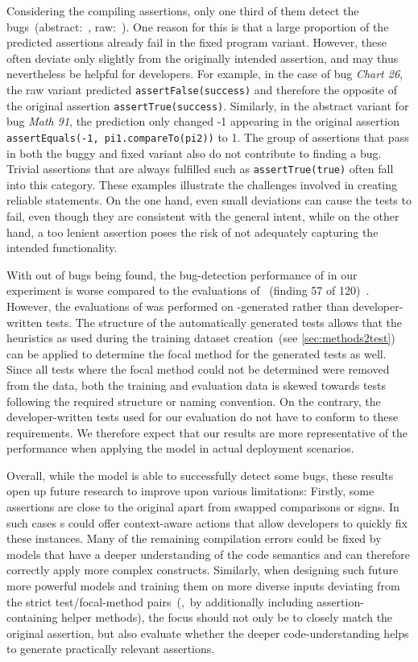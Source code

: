 Considering the compiling assertions, only one third of them detect
the bugs~(abstract:~, raw:~). One reason for
this is that a large proportion of the predicted assertions already
fail in the fixed program variant. However, these often deviate only
slightly from the originally intended assertion, and may thus
nevertheless be helpful for developers.
For example, in the case of bug \emph{Chart 26}, the raw variant
predicted \verb|assertFalse(success)| and therefore the opposite of
the original assertion \verb|assertTrue(success)|.
Similarly, in the abstract variant for bug \emph{Math 91}, the
prediction only changed -1 appearing in the original assertion
\verb|assertEquals(-1, pi1.compareTo(pi2))| to 1.
The group of assertions that pass in both the buggy and fixed variant
also do not contribute to finding a bug. Trivial assertions that are
always fulfilled such as \verb|assertTrue(true)| often fall into this
category.
These examples illustrate the challenges involved in creating reliable
statements. On the one hand, even small deviations can cause the tests
to fail, even though they are consistent with the general intent,
while on the other hand, a too lenient assertion poses the risk of not
adequately capturing the intended functionality.

With \dfjRawFoundBugs out of \dfjAssertionLocationInTestTotalBugs bugs
being found, the bug-detection performance of \assertfive in our
experiment is worse compared to the evaluations of \toga~(finding 57
of 120)~\cite{Dinella2022}. However, the evaluations of \toga was
performed on \evosuite-generated rather than developer-written tests.
The structure of the automatically generated tests allows that the
heuristics as used during the \methodstotest training dataset
creation~(see \cref{sec:methods2test}) can be applied to determine the
focal method for the generated tests as well.
Since all tests where the focal method could not be determined were
removed from the \methodstotest data, both the training and evaluation
data is skewed towards tests following the required structure or
naming convention.
On the contrary, the developer-written tests used for our evaluation
do not have to conform to these requirements. We therefore expect that
our results are more representative of the performance when applying
the model in actual deployment scenarios.

Overall, while the model is able to successfully detect some bugs,
these results open up future research to improve upon various
limitations:
Firstly, some assertions are close to the original apart from swapped
comparisons or signs. In such cases \ide{}s could offer context-aware
actions that allow developers to quickly fix these instances.
Many of the remaining compilation errors could be fixed by models that
have a deeper understanding of the code semantics and can therefore
correctly apply more complex constructs.
Similarly, when designing such future more powerful models and
training them on more diverse inputs deviating from the strict
test/focal-method pairs~(\eg,~by additionally including
assertion-containing helper methods), the focus should not only be to
closely match the original assertion, but also evaluate whether the
deeper code-understanding helps to generate practically relevant
assertions.


